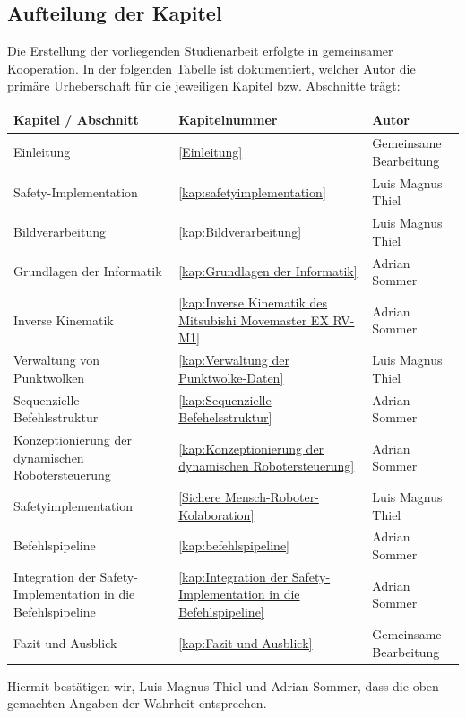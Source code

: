 \documentclass[12pt,a4paper]{report}
\newcommand{\autor}{Luis Magnus Thiel}
\newcommand{\autorzwei}{Adrian Sommer}
\begin{document}
\subsection*{Aufteilung der Kapitel}
Die Erstellung der vorliegenden Studienarbeit erfolgte in gemeinsamer Kooperation. In der folgenden Tabelle ist dokumentiert, welcher Autor die primäre Urheberschaft für die jeweiligen Kapitel bzw. Abschnitte trägt:

\vspace{0.5cm}
\renewcommand{\arraystretch}{1.5} %
\noindent
\begin{tabularx}{\textwidth}{|X|l|l|}
	\hline
	\textbf{Kapitel / Abschnitt} & \textbf{Kapitelnummer} & \textbf{Autor} \\ \hline
	Einleitung & \ref{Einleitung} & Gemeinsame Bearbeitung \\ \hline
	Safety-Implementation & \ref{kap:safetyimplementation} & \autor \\ \hline
	Bildverarbeitung & \ref{kap:Bildverarbeitung} & \autor \\ \hline
	Grundlagen der Informatik & \ref{kap:Grundlagen der Informatik} & \autorzwei \\ \hline
	Inverse Kinematik & \ref{kap:Inverse Kinematik des Mitsubishi Movemaster EX RV-M1} & \autorzwei \\ \hline
	Verwaltung von Punktwolken & \ref{kap:Verwaltung der Punktwolke-Daten} & \autor \\ \hline
	Sequenzielle Befehlsstruktur  & \ref{kap:Sequenzielle Befehelsstruktur} & \autorzwei \\ \hline
	Konzeptionierung der dynamischen Robotersteuerung & \ref{kap:Konzeptionierung der dynamischen Robotersteuerung} & \autorzwei \\ \hline
	Safetyimplementation & \ref{Sichere Mensch-Roboter-Kolaboration} & \autor \\ \hline
	Befehlspipeline & \ref{kap:befehlspipeline} & \autorzwei \\ \hline
	Integration der Safety-Implementation in die Befehlspipeline & \ref{kap:Integration der Safety-Implementation in die Befehlspipeline} & \autorzwei \\ \hline
	Fazit und Ausblick & \ref{kap:Fazit und Ausblick} & Gemeinsame Bearbeitung \\ \hline
\end{tabularx}
\newpage
Hiermit bestätigen wir, \autor{} und \autorzwei, dass die oben gemachten Angaben der Wahrheit entsprechen.
\vspace{2cm} %
\end{document}
